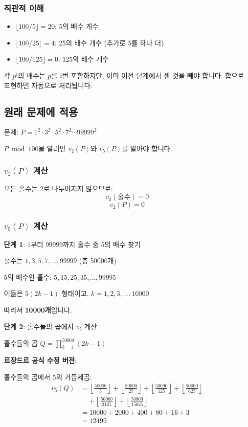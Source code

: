\documentclass[11pt,a4paper]{article}
\theoremstyle{definition}
\theoremstyle{remark}
\begin{document}
\subsubsection{직관적 이해}

\begin{itemize}
    \item $\lfloor 100/5 \rfloor = 20$: 5의 배수 개수
    \item $\lfloor 100/25 \rfloor = 4$: 25의 배수 개수 (추가로 5를 하나 더)
    \item $\lfloor 100/125 \rfloor = 0$: 125의 배수 개수
\end{itemize}

각 $p^i$의 배수는 $p$를 $i$번 포함하지만, 이미 이전 단계에서 센 것을 빼야 합니다.
합으로 표현하면 자동으로 처리됩니다.

\subsection{원래 문제에 적용}

문제: $P = 1^2 \cdot 3^2 \cdot 5^2 \cdot 7^2 \cdots 99999^2$

$P \bmod 100$을 알려면 $v_2(P)$와 $v_5(P)$를 알아야 합니다.

\subsubsection{$v_2(P)$ 계산}

모든 홀수는 2로 나누어지지 않으므로:
\[v_2(\text{홀수}) = 0\]
\[v_2(P) = 0\]

\subsubsection{$v_5(P)$ 계산}

\textbf{단계 1}: 1부터 99999까지 홀수 중 5의 배수 찾기

홀수는 $1, 3, 5, 7, \ldots, 99999$ (총 50000개)

5의 배수인 홀수: $5, 15, 25, 35, \ldots, 99995$

이들은 $5(2k-1)$ 형태이고, $k = 1, 2, 3, \ldots, 10000$

따라서 \textbf{10000개}입니다.

\textbf{단계 2}: 홀수들의 곱에서 $v_5$ 계산

홀수들의 곱 $Q = \prod_{k=1}^{50000} (2k-1)$

\textbf{르장드르 공식 수정 버전}:

홀수들의 곱에서 5의 거듭제곱:
\begin{align*}
v_5(Q) &= \left\lfloor \frac{50000}{5} \right\rfloor + \left\lfloor \frac{50000}{25} \right\rfloor + \left\lfloor \frac{50000}{125} \right\rfloor + \left\lfloor \frac{50000}{625} \right\rfloor \\
&\quad + \left\lfloor \frac{50000}{3125} \right\rfloor + \left\lfloor \frac{50000}{15625} \right\rfloor \\
&= 10000 + 2000 + 400 + 80 + 16 + 3 \\
&= 12499
\end{align*}
\end{document}
